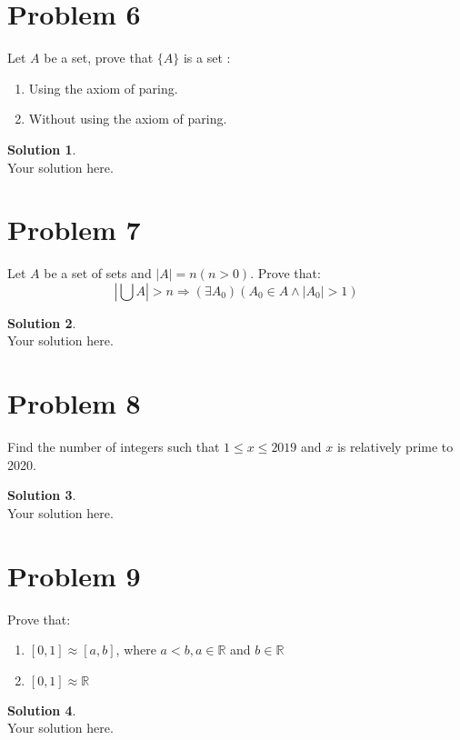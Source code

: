 \documentclass[a4paper,UTF8]{article}
\theoremstyle{definition}
\newtheorem*{solution}{Solution}
\begin{document}
\section*{Problem 6}
Let $A$ be a set, prove that $\{A\}$ is a set :
\begin{enumerate}
	\item Using the axiom of paring.
	\item Without using the axiom of paring.
\end{enumerate}

\begin{solution}
	~\\
	Your solution here.
\end{solution}


\section*{Problem 7}
Let $A$ be a set of sets and $|A|=n(n>0)$. Prove that:
$$|\bigcup A| >n \Rightarrow (\exists A_0 )(A_0\in A \land |A_0|>1)$$

\begin{solution}
	~\\
	Your solution here.
\end{solution}

\section*{Problem 8}
Find the number of integers such that $1 \le x\le 2019$ and $x$ is relatively prime to 2020.  

\begin{solution}
	~\\
	Your solution here.
\end{solution}


\section*{Problem 9}
Prove that:
\begin{enumerate}
	\item $[0,1]\approx [a,b]$, where $a<b,a\in \mathbb{R}$ and $b\in \mathbb{R}$
	\item $[0,1]\approx \mathbb{R}$
\end{enumerate}

\begin{solution}
~\\
Your solution here.
\end{solution}
\end{document}
